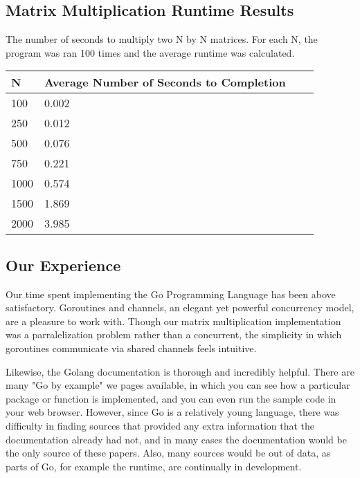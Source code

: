 \subsection{Matrix Multiplication Runtime Results}
The number of seconds to multiply two N by N matrices. For each N, the program was ran 100 times and the average runtime was calculated.
\begin{center}
    \begin{tabular}{ | l | l | l | p{5cm} |}
    \hline
    N & Average Number of Seconds to Completion \\ \hline
    100 & 0.002 \\ \hline
    250 & 0.012 \\ \hline
    500 & 0.076 \\ \hline
    750 & 0.221 \\ \hline
    1000 & 0.574 \\ \hline
    1500 & 1.869 \\ \hline
    2000 & 3.985 \\ \hline
    
    \hline
    \end{tabular}
\end{center}
\subsection{Our Experience}
Our time spent implementing the Go Programming Language has been above satisfactory. Goroutines and channels, an elegant yet powerful concurrency model, are a pleasure to work with. Though our matrix multiplication implementation was a parralelization problem rather than a concurrent, the simplicity in which goroutines communicate via shared channels feels intuitive.

Likewise, the Golang documentation is thorough and incredibly helpful. There are many "Go by example" we pages available, in which you can see how a particular package or function is implemented, and you can even run the sample code in your web browser. However, since Go is a relatively young language, there was difficulty in finding sources that provided any extra information that the documentation already had not, and in many cases the documentation would be the only source of these papers. Also, many sources would be out of data, as parts of Go, for example the runtime, are continually in development.

